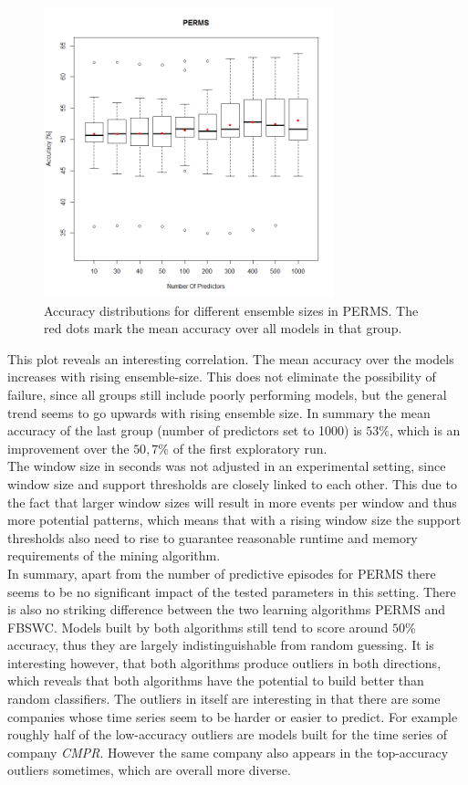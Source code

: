 \begin{figure}[h]
	\centering
  	\includegraphics[width=0.75\textwidth]{permsNumPredictors}
	\caption[Accuracy Trend depending on PERMS Ensemble Size]{Accuracy distributions for different ensemble sizes in PERMS. The red dots mark the mean accuracy over all models in that group.}
	\label{fig_permsNumPredictors}
\end{figure}

This plot reveals an interesting correlation. The mean accuracy over the models increases with rising ensemble-size. This does not eliminate the possibility of failure, since all groups still include poorly performing models, but the general trend seems to go upwards with rising ensemble size. In summary the mean accuracy of the last group (number of predictors set to 1000) is $53\%$, which is an improvement over the $50,7\%$ of the first exploratory run. \\
The window size in seconds was not adjusted in an experimental setting, since window size and support thresholds are closely linked to each other. This due to the fact that larger window sizes will result in more events per window and thus more potential patterns, which means that with a rising window size the support thresholds also need to rise to guarantee reasonable runtime and memory requirements of the mining algorithm. \\
In summary, apart from the number of predictive episodes for PERMS there seems to be no significant impact of the tested parameters in this setting. There is also no striking difference between the two learning algorithms PERMS and FBSWC. Models built by both algorithms still tend to score around $50\%$ accuracy, thus they are largely indistinguishable from random guessing. It is interesting however, that both algorithms produce outliers in both directions, which reveals that both algorithms have the potential to build better than random classifiers. The outliers in itself are interesting in that there are some companies whose time series seem to be harder or easier to predict. For example roughly half of the low-accuracy outliers are models built for the time series of company \textit{CMPR}. However the same company also appears in the top-accuracy outliers sometimes, which are overall more diverse.

